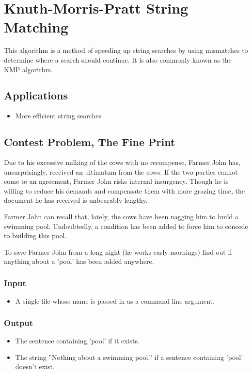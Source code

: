 \section{Knuth-Morris-Pratt String Matching}
This algorithm is a method of speeding up string searches by using mismatches to determine where a search should continue.
It is also commonly known as the KMP algorithm.

\subsection{Applications}
\begin{itemize}
	\item{More efficient string searches}
\end{itemize}

\subsection{Contest Problem, The Fine Print}
Due to his excessive milking of the cows with no recompense, Farmer John has, unsurprisingly, received an ultimatum from the cows.
If the two parties cannot come to an agreement, Farmer John risks internal insurgency.
Though he is willing to reduce his demands and compensate them with more grazing time, the document he has received is unbearably lengthy.

Farmer John can recall that, lately, the cows have been nagging him to build a swimming pool.
Undoubtedly, a condition has been added to force him to concede to building this pool.

To save Farmer John from a long night (he works early mornings) find out if anything about a 'pool' has been added anywhere.

\subsubsection{Input}
\begin{itemize}
	\item A single file whose name is passed in as a command line argument.
\end{itemize}

\subsubsection{Output}
\begin{itemize}
	\item The sentence containing 'pool' if it exists.
	\item The string ''Nothing about a swimming pool.'' if a sentence containing 'pool' doesn't exist.
\end{itemize}
